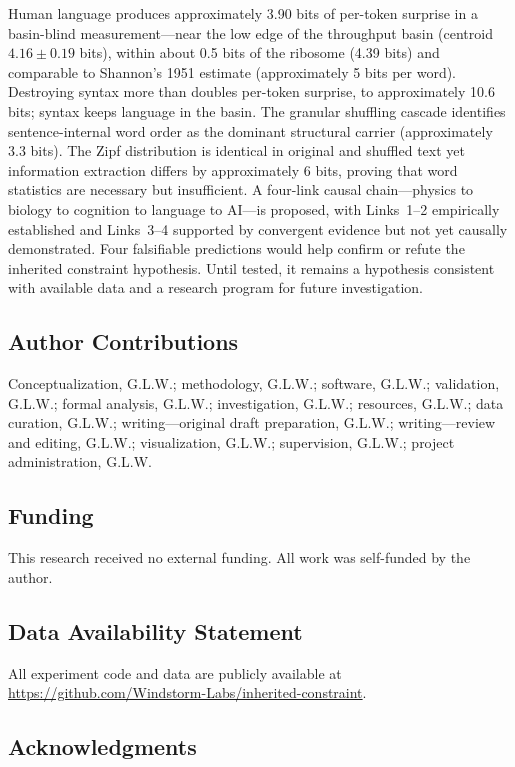 \documentclass[11pt]{article}
\begin{document}
Human language produces approximately 3.90 bits of per-token surprise in a basin-blind measurement---near the low edge of the throughput basin (centroid $4.16 \pm 0.19$ bits), within about 0.5 bits of the ribosome (4.39 bits) and comparable to Shannon's 1951 estimate (approximately 5 bits per word). Destroying syntax more than doubles per-token surprise, to approximately 10.6 bits; syntax keeps language in the basin. The granular shuffling cascade identifies sentence-internal word order as the dominant structural carrier (approximately 3.3 bits). The Zipf distribution is identical in original and shuffled text yet information extraction differs by approximately 6 bits, proving that word statistics are necessary but insufficient. A four-link causal chain---physics to biology to cognition to language to AI---is proposed, with Links~1--2 empirically established and Links~3--4 supported by convergent evidence but not yet causally demonstrated. Four falsifiable predictions would help confirm or refute the inherited constraint hypothesis. Until tested, it remains a hypothesis consistent with available data and a research program for future investigation.

\subsection*{Author Contributions}

Conceptualization, G.L.W.; methodology, G.L.W.; software, G.L.W.; validation, G.L.W.; formal analysis, G.L.W.; investigation, G.L.W.; resources, G.L.W.; data curation, G.L.W.; writing---original draft preparation, G.L.W.; writing---review and editing, G.L.W.; visualization, G.L.W.; supervision, G.L.W.; project administration, G.L.W.

\subsection*{Funding}

This research received no external funding. All work was self-funded by the author.

\subsection*{Data Availability Statement}

All experiment code and data are publicly available at \url{https://github.com/Windstorm-Labs/inherited-constraint}.

\subsection*{Acknowledgments}
\end{document}
